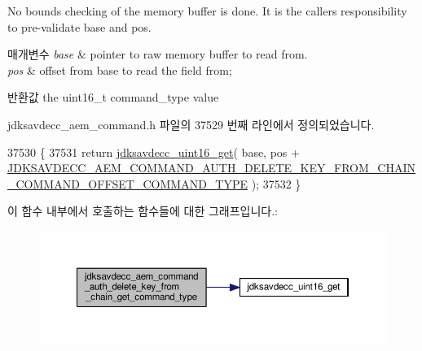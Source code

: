 No bounds checking of the memory buffer is done. It is the caller\textquotesingle{}s responsibility to pre-\/validate base and pos.


\begin{DoxyParams}{매개변수}
{\em base} & pointer to raw memory buffer to read from. \\
\hline
{\em pos} & offset from base to read the field from; \\
\hline
\end{DoxyParams}
\begin{DoxyReturn}{반환값}
the uint16\+\_\+t command\+\_\+type value 
\end{DoxyReturn}


jdksavdecc\+\_\+aem\+\_\+command.\+h 파일의 37529 번째 라인에서 정의되었습니다.


\begin{DoxyCode}
37530 \{
37531     \textcolor{keywordflow}{return} \hyperlink{group__endian_ga3fbbbc20be954aa61e039872965b0dc9}{jdksavdecc\_uint16\_get}( base, pos + 
      \hyperlink{group__command__auth__delete__key__from__chain_gaf75b2a3f00a68b96e28ed1c660c8696f}{JDKSAVDECC\_AEM\_COMMAND\_AUTH\_DELETE\_KEY\_FROM\_CHAIN\_COMMAND\_OFFSET\_COMMAND\_TYPE}
       );
37532 \}
\end{DoxyCode}


이 함수 내부에서 호출하는 함수들에 대한 그래프입니다.\+:
\nopagebreak
\begin{figure}[H]
\begin{center}
\leavevmode
\includegraphics[width=350pt]{group__command__auth__delete__key__from__chain_gae905560a17462b33748a332da4f52fbb_cgraph}
\end{center}
\end{figure}


